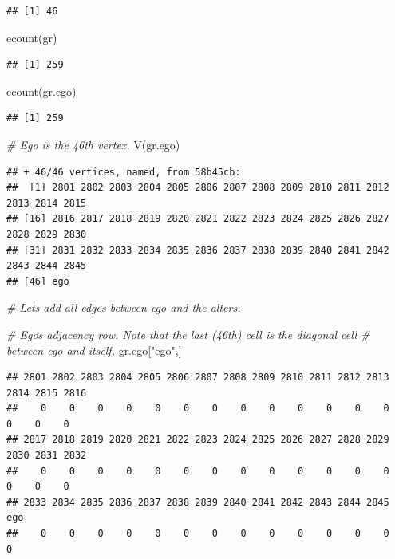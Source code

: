 \documentclass[
]{book}
\newenvironment{Shaded}{\begin{snugshade}}{\end{snugshade}}
\newcommand{\CommentTok}[1]{\textcolor[rgb]{0.56,0.35,0.01}{\textit{#1}}}
\newcommand{\FunctionTok}[1]{\textcolor[rgb]{0.00,0.00,0.00}{#1}}
\newcommand{\NormalTok}[1]{#1}
\newcommand{\StringTok}[1]{\textcolor[rgb]{0.31,0.60,0.02}{#1}}
\begin{document}
\begin{verbatim}
## [1] 46
\end{verbatim}

\begin{Shaded}
\begin{Highlighting}[]
\FunctionTok{ecount}\NormalTok{(gr)}
\end{Highlighting}
\end{Shaded}

\begin{verbatim}
## [1] 259
\end{verbatim}

\begin{Shaded}
\begin{Highlighting}[]
\FunctionTok{ecount}\NormalTok{(gr.ego)}
\end{Highlighting}
\end{Shaded}

\begin{verbatim}
## [1] 259
\end{verbatim}

\begin{Shaded}
\begin{Highlighting}[]
\CommentTok{\# Ego is the 46th vertex.}
\FunctionTok{V}\NormalTok{(gr.ego)}
\end{Highlighting}
\end{Shaded}

\begin{verbatim}
## + 46/46 vertices, named, from 58b45cb:
##  [1] 2801 2802 2803 2804 2805 2806 2807 2808 2809 2810 2811 2812 2813 2814 2815
## [16] 2816 2817 2818 2819 2820 2821 2822 2823 2824 2825 2826 2827 2828 2829 2830
## [31] 2831 2832 2833 2834 2835 2836 2837 2838 2839 2840 2841 2842 2843 2844 2845
## [46] ego
\end{verbatim}

\begin{Shaded}
\begin{Highlighting}[]
\CommentTok{\# Let\textquotesingle{}s add all edges between ego and the alters.}

\CommentTok{\# Ego\textquotesingle{}s adjacency row. Note that the last (46th) cell is the diagonal cell}
\CommentTok{\# between ego and itself.}
\NormalTok{gr.ego[}\StringTok{"ego"}\NormalTok{,]}
\end{Highlighting}
\end{Shaded}

\begin{verbatim}
## 2801 2802 2803 2804 2805 2806 2807 2808 2809 2810 2811 2812 2813 2814 2815 2816 
##    0    0    0    0    0    0    0    0    0    0    0    0    0    0    0    0 
## 2817 2818 2819 2820 2821 2822 2823 2824 2825 2826 2827 2828 2829 2830 2831 2832 
##    0    0    0    0    0    0    0    0    0    0    0    0    0    0    0    0 
## 2833 2834 2835 2836 2837 2838 2839 2840 2841 2842 2843 2844 2845  ego 
##    0    0    0    0    0    0    0    0    0    0    0    0    0    0
\end{verbatim}
\end{document}
